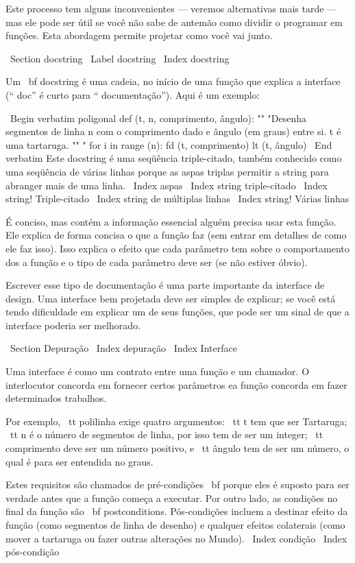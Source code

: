 \documentclass[10pt]{book}
\begin{document}
\begin {itemize}
{Este processo tem alguns inconvenientes --- veremos alternativas mais tarde --- mas
ele pode ser útil se você não sabe de antemão como dividir o
programar em funções. Esta abordagem permite projetar como você vai
junto.


\ Section {} docstring
\ Label {} docstring
\ Index {} docstring

Um {\ bf docstring} é uma cadeia, no início de uma função que
explica a interface (`` doc'' é curto para `` documentação''). Aqui
é um exemplo:

\ Begin {verbatim}
poligonal def (t, n, comprimento, ângulo):
    "" "Desenha segmentos de linha n com o comprimento dado e
    ângulo (em graus) entre si. t é uma tartaruga.
    "" "    
    for i in range (n):
        fd (t, comprimento)
        lt (t, ângulo)
\ End {verbatim}
%
Este docstring é uma seqüência triple-citado, também conhecido
como uma seqüência de várias linhas porque as aspas triplas permitir a string
para abranger mais de uma linha.
\ Index {aspas}
\ Index {string triple-citado}
\ Index {string! Triple-citado}
\ Index {string de múltiplas linhas}
\ Index {string! Várias linhas}

É conciso, mas contém a informação essencial
alguém precisa usar esta função. Ele explica de forma concisa o que
a função faz (sem entrar em detalhes de como ele faz
isso). Isso explica o efeito que cada parâmetro tem sobre o comportamento dos
a função e o tipo de cada parâmetro deve ser (se não estiver
óbvio).

Escrever esse tipo de documentação é uma parte importante da interface de
design. Uma interface bem projetada deve ser simples de explicar;
se você está tendo dificuldade em explicar um de seus funções,
que pode ser um sinal de que a interface poderia ser melhorado.


\ Section {} Depuração
\ Index {depuração}
\ Index {Interface}

Uma interface é como um contrato entre uma função e um chamador.
O interlocutor concorda em fornecer certos parâmetros ea função
concorda em fazer determinados trabalhos.

Por exemplo, {\ tt polilinha} exige quatro argumentos: {\ tt t} tem que ser
Tartaruga; {\ tt n} é o número de segmentos de linha, por isso tem de ser um
integer; {\ tt comprimento} deve ser um número positivo, e {\ tt
  ângulo} tem de ser um número, o qual é para ser entendida no graus.

Estes requisitos são chamados de pré-condições {\ bf} porque eles
é suposto para ser verdade antes que a função começa a executar.
Por outro lado, as condições no final da função são
{\ bf postconditions}. Pós-condições incluem a destinar
efeito da função (como segmentos de linha de desenho) e qualquer
efeitos colaterais (como mover a tartaruga ou fazer outras alterações
no Mundo).
\ Index {condição}
\ Index {pós-condição}

}
\end{itemize}
\end{document}
